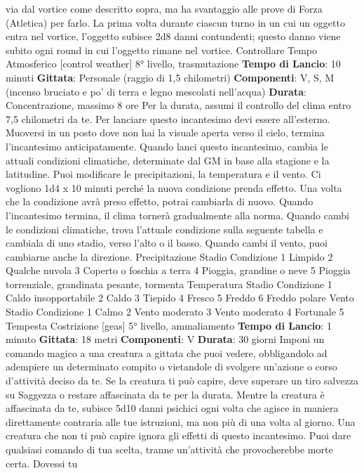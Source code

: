 \begin{multicols}{2}
via dal vortice come descritto sopra, ma ha svantaggio
alle prove di Forza (Atletica) per farlo.
La prima volta durante ciascun turno in un cui un
oggetto entra nel vortice, l’oggetto subisce 2d8 danni
contundenti; questo danno viene subito ogni round in
cui l’oggetto rimane nel vortice.
Controllare Tempo Atmosferico
[control weather]
8° livello, trasmutazione
\textbf{Tempo di Lancio}: 10 minuti
\textbf{Gittata}: Personale (raggio di 1,5 chilometri)
\textbf{Componenti}: V, S, M (incenso bruciato e po’ di terra e
legno mescolati nell’acqua)
\textbf{Durata}: Concentrazione, massimo 8 ore
Per la durata, assumi il controllo del clima entro 7,5
chilometri da te. Per lanciare questo incantesimo devi
essere all’esterno. Muoversi in un posto dove non hai la
visuale aperta verso il cielo, termina l’incantesimo
anticipatamente.
Quando lanci questo incantesimo, cambia le attuali
condizioni climatiche, determinate dal GM in base alla
stagione e la latitudine. Puoi modificare le
precipitazioni, la temperatura e il vento. Ci vogliono 1d4
x 10 minuti perché la nuova condizione prenda effetto.
Una volta che la condizione avrà preso effetto, potrai
cambiarla di nuovo. Quando l’incantesimo termina, il
clima tornerà gradualmente alla norma.
Quando cambi le condizioni climatiche, trova l’attuale
condizione sulla seguente tabella e cambiala di uno
stadio, verso l’alto o il basso. Quando cambi il vento,
puoi cambiarne anche la direzione.
Precipitazione
Stadio Condizione
1 Limpido
2 Qualche nuvola
3 Coperto o foschia a terra
4 Pioggia, grandine o neve
5 Pioggia torrenziale, grandinata pesante, tormenta
Temperatura
Stadio Condizione
1 Caldo insopportabile
2 Caldo
3 Tiepido
4 Fresco
5 Freddo
6 Freddo polare
Vento
Stadio Condizione
1 Calmo
2 Vento moderato
3 Vento moderato
4 Fortunale
5 Tempesta
Costrizione
[geas]
5° livello, ammaliamento
\textbf{Tempo di Lancio}: 1 minuto
\textbf{Gittata}: 18 metri
\textbf{Componenti}: V
\textbf{Durata}: 30 giorni
Imponi un comando magico a una creatura a gittata che
puoi vedere, obbligandolo ad adempiere un determinato
compito o vietandole di svolgere un’azione o corso
d’attività deciso da te. Se la creatura ti può capire, deve
superare un tiro salvezza su Saggezza o restare
affascinata da te per la durata. Mentre la creatura è
affascinata da te, subisce 5d10 danni psichici ogni volta
che agisce in maniera direttamente contraria alle tue
istruzioni, ma non più di una volta al giorno. Una
creatura che non ti può capire ignora gli effetti di questo
incantesimo.
Puoi dare qualsiasi comando di tua scelta, tranne
un’attività che provocherebbe morte certa. Dovessi tu

\end{multicols}
